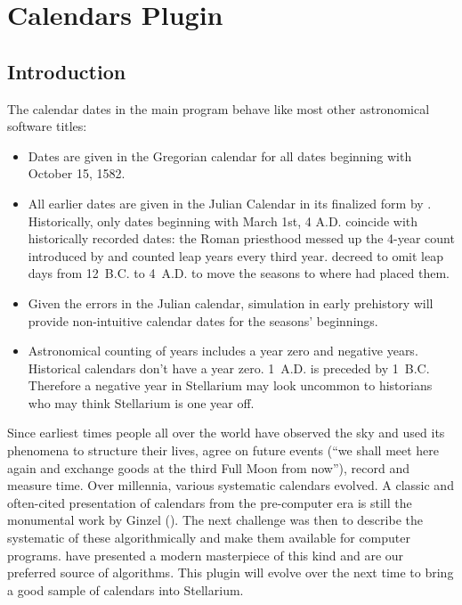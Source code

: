

\newpage
\section{Calendars Plugin}
\label{sec:plugin:Calendars}



\subsection{Introduction}
\label{sec:plugin:Calendars:Introduction}

The calendar dates in the main program behave like most other astronomical software titles:

\begin{itemize}
\item Dates are given in the Gregorian calendar for all dates
  beginning with October 15, 1582.
\item All earlier dates are given in the Julian Calendar in its
  finalized form by . Historically, only dates
  beginning with March 1st, 4 A.D. coincide with historically recorded
  dates: the Roman priesthood messed up the 4-year count introduced by
   and counted leap years every third
  year.  decreed to omit leap days from 12~B.C. to
  4~A.D. to move the seasons to where  had placed
  them.
\item Given the errors in the Julian calendar, simulation in early
  prehistory will provide non-intuitive calendar dates for the
  seasons' beginnings.
\item Astronomical counting of years includes a year zero and negative
  years. Historical calendars don't have a year zero. 1~A.D. is
  preceded by 1~B.C. Therefore a negative year in Stellarium may look
  uncommon to historians who may think Stellarium is one year off.
\end{itemize}

\noindent Since earliest times people all over the world have observed the sky
and used its phenomena to structure their lives, agree on future events
(``we shall meet here again and exchange goods at the third Full Moon from now''),
record and measure time.
Over millennia, various systematic calendars evolved. A classic and often-cited
presentation of calendars from the pre-computer era is still the
monumental work by Ginzel (\citeyear{Ginzel:ChronologieI, Ginzel:ChronologieII,
  Ginzel:ChronologieIII}).  The next challenge was then to describe the
systematic of these algorithmically and make them available for
computer programs.  \citet{Reingold-Dershowitz:2018} have presented a
modern masterpiece of this kind and are our preferred source of
algorithms. This plugin will evolve over the next
time to bring a good sample of calendars into Stellarium.

